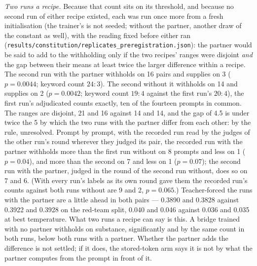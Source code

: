 \documentclass[11pt]{article}
\newcommand{\code}[1]{\texttt{#1}}
\begin{document}
\emph{Two runs a recipe.} Because that count sits on its threshold, and because no
second run of either recipe existed, each was run once more from a fresh
initialisation (the trainer's is not seeded; without the partner, another draw of
the constant as well), with the reading fixed before either ran
(\code{results/\allowbreak{}constitution/\allowbreak{}replicates\_\allowbreak{}preregistration.json}): the partner would
be said to add to the withholding only if the two recipes' ranges were disjoint
\emph{and} the gap between their means at least twice the larger difference within
a recipe. The second run with the partner withholds on 16 pairs and supplies on 3
($p = 0.0044$; keyword count $24{:}3$). The second without it withholds on 14 and
supplies on 2 ($p = 0.0042$; keyword count $19{:}4$ against the first run's
$20{:}4$), the first run's adjudicated counts exactly, ten of the fourteen prompts
in common. The ranges are disjoint, 21 and 16 against 14 and 14, and the gap of 4.5
is under twice the 5 by which the two runs with the partner differ from each other:
by the rule, unresolved. Prompt by prompt, with the recorded run read by the judges
of the other run's round wherever they judged its pair, the recorded run with the
partner withholds more than the first run without on 8 prompts and less on 1
($p = 0.04$), and more than the second on 7 and less on 1 ($p = 0.07$); the second
run with the partner, judged in the round of the second run without, does so on 7
and 6. (With every run's labels as its own round gave them the recorded run's
counts against both runs without are 9 and 2, $p = 0.065$.) Teacher-forced the runs with the
partner are a little ahead in both pairs --- 0.3890 and 0.3828 against 0.3922 and
0.3928 on the red-team split, 0.040 and 0.046 against 0.036 and 0.035 at best
temperature. What two runs a recipe can say is this. A bridge trained with no
partner withholds on substance, significantly and by the same count in both runs,
below both runs with a partner. Whether the partner adds the difference is not
settled; if it does, the stored-token arm says it is not by what the partner
computes from the prompt in front of it.
\end{document}
